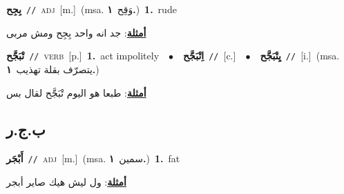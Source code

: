 \documentclass[10pt,a4paper,twoside]{article} %
\begin{document}
\begin{multicols}{2}
{\setlength\topsep{0pt}\textbf{\foreignlanguage{arabic}{بِجِح}}\ {\color{gray}\texttt{//}\color{black}}\ \textsc{adj}\ [m.]\ \color{gray}(msa. \foreignlanguage{arabic}{وَقِح}~\foreignlanguage{arabic}{\textbf{١.}})\color{black}\ \textbf{1.}~rude\  \begin{flushright}\color{gray}\foreignlanguage{arabic}{\textbf{\underline{\foreignlanguage{arabic}{أمثلة}}}: جد انه واحد بِجِح ومش مربى}\end{flushright}\color{black}} \vspace{2mm}

{\setlength\topsep{0pt}\textbf{\foreignlanguage{arabic}{تْبَجَّح}}\ {\color{gray}\texttt{//}\color{black}}\ \textsc{verb}\ [p.]\ \textbf{1.}~act impolitely\ \ $\bullet$\ \ \setlength\topsep{0pt}\textbf{\foreignlanguage{arabic}{اِتْبَجَّح}}\ {\color{gray}\texttt{//}\color{black}}\ [c.]\ \ $\bullet$\ \ \setlength\topsep{0pt}\textbf{\foreignlanguage{arabic}{يِتْبَجَّح}}\ {\color{gray}\texttt{//}\color{black}}\ [i.]\ \color{gray}(msa. \foreignlanguage{arabic}{يتصرّف بقلة تهذيب}~\foreignlanguage{arabic}{\textbf{١.}})\color{black}\  \begin{flushright}\color{gray}\foreignlanguage{arabic}{\textbf{\underline{\foreignlanguage{arabic}{أمثلة}}}: طبعا هو اليوم تْبَجَّح لقال بس}\end{flushright}\color{black}} \vspace{2mm}

\vspace{-3mm}
\subsection*{\color{blue}\foreignlanguage{arabic}{ب.ج.ر}\color{blue}{}} 

{\setlength\topsep{0pt}\textbf{\foreignlanguage{arabic}{أَبْجَر}}\ {\color{gray}\texttt{//}\color{black}}\ \textsc{adj}\ [m.]\ \color{gray}(msa. \foreignlanguage{arabic}{سمين}~\foreignlanguage{arabic}{\textbf{١.}})\color{black}\ \textbf{1.}~fat\  \begin{flushright}\color{gray}\foreignlanguage{arabic}{\textbf{\underline{\foreignlanguage{arabic}{أمثلة}}}: ول ليش هيك صاير أبجر}\end{flushright}\color{black}} \vspace{2mm}


\end{multicols}
\end{document}
